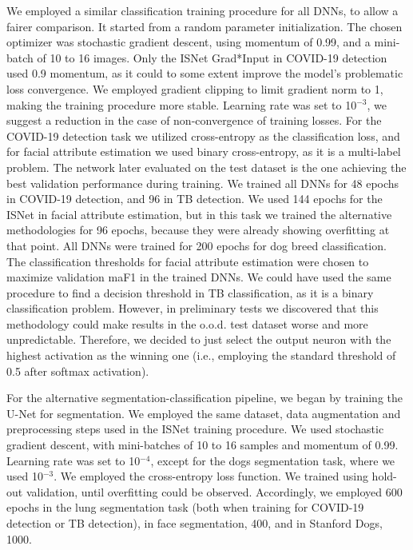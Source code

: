 \documentclass[fleqn,10pt]{wlscirep}
\begin{document}
{We employed a similar classification training procedure for all DNNs, to allow a fairer comparison. It started from a random parameter initialization. The chosen optimizer was stochastic gradient descent, using momentum of 0.99, and a mini-batch of 10 to 16 images. Only the ISNet Grad*Input in COVID-19 detection used 0.9 momentum, as it could to some extent improve the model's problematic loss convergence. We employed gradient clipping to limit gradient norm to 1, making the training procedure more stable. Learning rate was set to 10$^{-3}$, we suggest a reduction in the case of non-convergence of training losses. For the COVID-19 detection task we utilized cross-entropy as the classification loss, and for facial attribute estimation we used binary cross-entropy, as it is a multi-label problem. The network later evaluated on the test dataset is the one achieving the best validation performance during training. We trained all DNNs for 48 epochs in COVID-19 detection, and 96 in TB detection. We used 144 epochs for the ISNet in facial attribute estimation, but in this task we trained the alternative methodologies for 96 epochs, because they were already showing overfitting at that point. All DNNs were trained for 200 epochs for dog breed classification. The classification thresholds for facial attribute estimation were chosen to maximize validation maF1 in the trained DNNs. We could have used the same procedure to find a decision threshold in TB classification, as it is a binary classification problem. However, in preliminary tests we discovered that this methodology could make results in the o.o.d. test dataset worse and more unpredictable. Therefore, we decided to just select the output neuron with the highest activation as the winning one (i.e., employing the standard threshold of 0.5 after softmax activation).

For the alternative segmentation-classification pipeline, we began by training the U-Net for segmentation. We employed the same dataset, data augmentation and preprocessing steps used in the ISNet training procedure. We used stochastic gradient descent, with mini-batches of 10 to 16 samples and momentum of 0.99. Learning rate was set to 10$^{-4}$, except for the dogs segmentation task, where we used 10$^{-3}$. We employed the cross-entropy loss function. We trained using hold-out validation, until overfitting could be observed. Accordingly, we employed 600 epochs in the lung segmentation task (both when training for COVID-19 detection or TB detection), in face segmentation, 400, and in Stanford Dogs, 1000.

}
\end{document}

